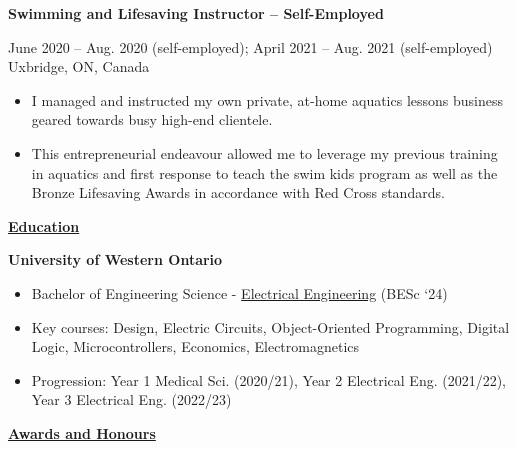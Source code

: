 \documentclass[
]{article}
\begin{document}
\textbf{Swimming and Lifesaving Instructor -- Self-Employed}

June 2020 -- Aug. 2020 (self-employed); April 2021 -- Aug. 2021
(self-employed) \textbar{} Uxbridge, ON, Canada

\begin{itemize}
      \item
            I managed and instructed my own private, at-home aquatics lessons
            business geared towards busy high-end clientele.
      \item
            This entrepreneurial endeavour allowed me to leverage my previous
            training in aquatics and first response to teach the swim kids program
            as well as the Bronze Lifesaving Awards in accordance with Red Cross
            standards.
\end{itemize}

\textbf{\uline{Education}}

\textbf{University of Western Ontario}

\begin{itemize}
      \item
            Bachelor of Engineering Science -
            \href{https://www.eng.uwo.ca/undergraduate/programs/electrical.html}{Electrical
                  Engineering} (BESc `24)
      \item
            Key courses: Design, Electric Circuits, Object-Oriented Programming,
            Digital Logic, Microcontrollers, Economics, Electromagnetics
      \item
            Progression: Year 1 Medical Sci. (2020/21), Year 2 Electrical Eng.
            (2021/22), Year 3 Electrical Eng. (2022/23)
\end{itemize}

\textbf{\uline{Awards and Honours}}
\end{document}
